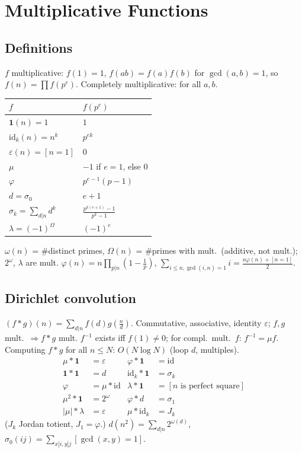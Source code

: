 \section{Multiplicative Functions}
\subsection{Definitions}
$f$ multiplicative: $f(1)=1$, $f(ab)=f(a)f(b)$ for $\gcd(a,b)=1$,
so $f(n)=\prod f(p^e)$. Completely multiplicative: for all $a,b$.
\begin{center}
\small
\begin{tabular}{l|l}
$f$ & $f(p^e)$ \\ \hline
$\mathbf 1(n)=1$ & $1$ \\
$\mathrm{id}_k(n)=n^k$ & $p^{ek}$ \\
$\varepsilon(n)=[n=1]$ & $0$ \\
$\mu$ & $-1$ if $e=1$, else $0$ \\
$\varphi$ & $p^{e-1}(p-1)$ \\
$d=\sigma_0$ & $e+1$ \\
$\sigma_k=\sum_{d|n}d^k$ & $\frac{p^{k(e+1)}-1}{p^k-1}$ \\
$\lambda=(-1)^{\Omega}$ & $(-1)^e$ \\
\end{tabular}
\end{center}
$\omega(n)$ = \#distinct primes, $\Omega(n)$ = \#primes with mult.\
(additive, not mult.); $2^{\omega}$, $\lambda$ are mult.
$\varphi(n)=n\prod_{p|n}(1-\frac1p)$, $\sum_{i\le n,\gcd(i,n)=1}i=\frac{n\varphi(n)+[n=1]}{2}$.

\subsection{Dirichlet convolution}
$(f*g)(n)=\sum_{d|n}f(d)g(\frac nd)$. Commutative, associative,
identity $\varepsilon$; $f,g$ mult.\ $\Rightarrow f*g$ mult.
$f^{-1}$ exists iff $f(1)\ne0$; for compl.\ mult.\ $f$: $f^{-1}=\mu f$.
Computing $f*g$ for all $n\le N$: $O(N\log N)$ (loop $d$, multiples).
\begin{align*}
\mu*\mathbf 1&=\varepsilon & \varphi*\mathbf 1&=\mathrm{id}\\
\mathbf 1*\mathbf 1&=d & \mathrm{id}_k*\mathbf 1&=\sigma_k\\
\varphi&=\mu*\mathrm{id} & \lambda*\mathbf 1&=[n\text{ is perfect square}]\\
\mu^2*\mathbf 1&=2^{\omega} & \varphi*d&=\sigma_1\\
|\mu|*\lambda&=\varepsilon & \mu*\mathrm{id}_k&=J_k
\end{align*}
($J_k$ Jordan totient, $J_1=\varphi$.) $d(n^2)=\sum_{d|n}2^{\omega(d)}$,
$\sigma_0(ij)=\sum_{x|i,y|j}[\gcd(x,y)=1]$.

